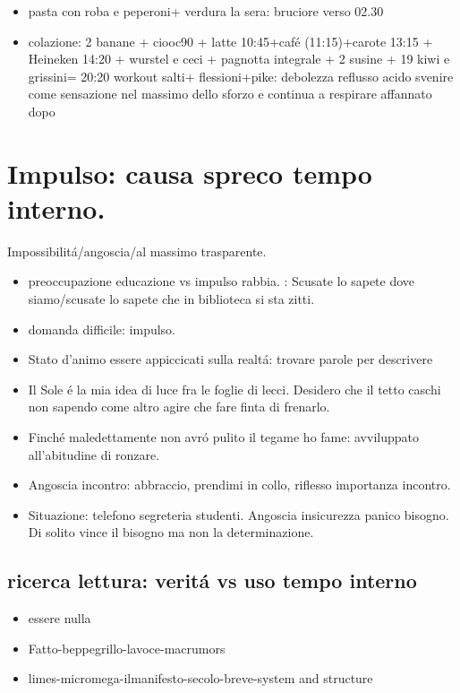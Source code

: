 \begin{itemize}
\item pasta con roba e peperoni+ verdura la sera: bruciore verso 02.30
\item colazione: 2 banane + ciooc90 + latte 10:45+caf\'e (11:15)+carote 13:15 + Heineken 14:20 + w\:urstel e ceci + pagnotta integrale + 2 susine  + 19 kiwi e grissini= 20:20 workout salti+
flessioni+pike: debolezza reflusso acido svenire come sensazione nel massimo dello sforzo e continua a respirare affannato dopo
\end{itemize}

\section{Impulso: causa spreco tempo interno.}

Impossibilit\'a/angoscia/al massimo trasparente. 

\begin{itemize}
\item preoccupazione educazione vs impulso rabbia.
: Scusate lo sapete dove siamo/scusate lo sapete che in biblioteca si sta zitti.
\item domanda difficile: impulso.
\item Stato d'animo essere appiccicati sulla realt\'a: trovare parole per descrivere
\item Il Sole \'e la mia idea di luce fra le foglie di lecci. Desidero che il tetto caschi non sapendo come altro agire che fare finta di frenarlo.
\item Finch\'e maledettamente non avr\'o pulito il tegame ho fame: avviluppato all'abitudine di ronzare.
\item Angoscia incontro: abbraccio, prendimi in collo, riflesso importanza incontro.
\item Situazione: telefono segreteria studenti. Angoscia insicurezza panico bisogno. Di solito vince il bisogno ma non la determinazione.
\end{itemize}

\subsection{ricerca lettura: verit\'a vs uso tempo interno}

\begin{itemize}
\item essere nulla
\item Fatto-beppegrillo-lavoce-macrumors
\item limes-micromega-ilmanifesto-secolo-breve-system and structure
\end{itemize}

